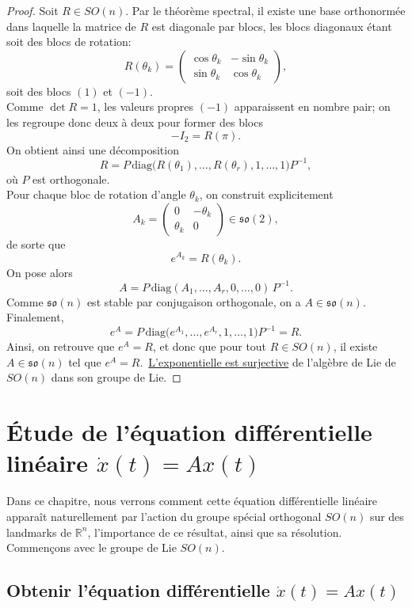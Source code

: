\documentclass[12pt]{report}
\begin{document}
\begin{proof}
Soit $R\in SO(n)$. Par le théorème spectral, il existe une base orthonormée dans laquelle la matrice de $R$ est diagonale par blocs, les blocs diagonaux étant soit des blocs de rotation:
\[
R(\theta_k)=\begin{pmatrix}\cos\theta_k & -\sin\theta_k\\\sin\theta_k & \cos\theta_k\end{pmatrix},
\]
soit des blocs $(1)$ et $(-1)$.\\
Comme $\det R=1$, les valeurs propres $(-1)$ apparaissent en nombre pair; on les regroupe donc deux à deux pour former des blocs
\[
-I_2=R(\pi).
\]
On obtient ainsi une décomposition
\[
R=P\,\mathrm{diag}\bigl(R(\theta_1),\ldots,R(\theta_r),1,\ldots,1\bigr)P^{-1},
\]
où $P$ est orthogonale.\\
Pour chaque bloc de rotation d'angle $\theta_k$, on construit explicitement
\[
A_k=\begin{pmatrix}0 & -\theta_k\\\theta_k & 0\end{pmatrix}\in \mathfrak{so}(2),
\]
de sorte que
\[
e^{A_k}=R(\theta_k).
\]
On pose alors
\[
A=P\,\mathrm{diag}(A_1,\ldots,A_r,0,\ldots,0)\,P^{-1}.
\]
Comme $\mathfrak{so}(n)$ est stable par conjugaison orthogonale, on a $A\in\mathfrak{so}(n)$.\\
Finalement,
\[
e^A=P\,\mathrm{diag}\bigl(e^{A_1},\ldots,e^{A_r},1,\ldots,1\bigr)P^{-1}=R.
\]
Ainsi, on retrouve que $e^A=R$, et donc que pour tout $R\in SO(n)$, il existe $A\in\mathfrak{so}(n)$ tel que $e^A=R$.~\underline{L'exponentielle est surjective} de l'algèbre de Lie de $SO(n)$ dans son groupe de Lie.
\end{proof}


\chapter{Étude de l'équation différentielle linéaire \texorpdfstring{$\dot{x}(t)=Ax(t)$}{x.\ (t)=Ax (t)}}

Dans ce chapitre, nous verrons comment cette équation différentielle linéaire apparaît naturellement par l'action du groupe spécial orthogonal $SO(n)$ sur des landmarks de $\mathbb{R}^n$, l'importance de ce résultat, ainsi que sa résolution. Commençons avec le groupe de Lie $SO(n)$.

\section{Obtenir l'équation différentielle \texorpdfstring{$\dot{x}(t)=Ax(t)$}{x.\ (t)=Ax (t)}}
\end{document}
